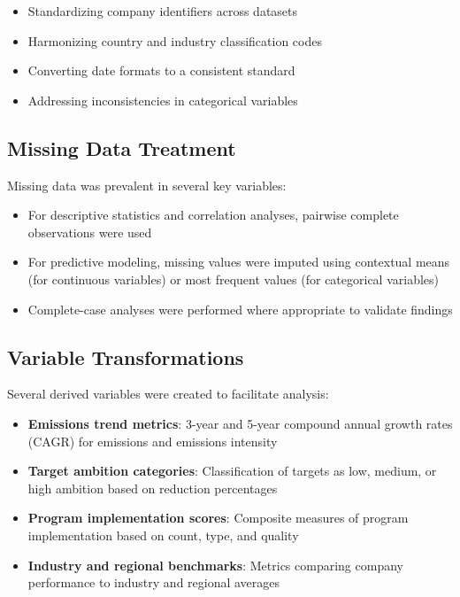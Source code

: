 \documentclass[11pt,a4paper]{article}
\begin{document}
\begin{itemize}
    \item Standardizing company identifiers across datasets
    \item Harmonizing country and industry classification codes
    \item Converting date formats to a consistent standard
    \item Addressing inconsistencies in categorical variables
\end{itemize}

\subsection{Missing Data Treatment}
Missing data was prevalent in several key variables:

\begin{itemize}
    \item For descriptive statistics and correlation analyses, pairwise complete observations were used
    \item For predictive modeling, missing values were imputed using contextual means (for continuous variables) or most frequent values (for categorical variables)
    \item Complete-case analyses were performed where appropriate to validate findings
\end{itemize}

\subsection{Variable Transformations}
Several derived variables were created to facilitate analysis:

\begin{itemize}
    \item \textbf{Emissions trend metrics}: 3-year and 5-year compound annual growth rates (CAGR) for emissions and emissions intensity
    
    \item \textbf{Target ambition categories}: Classification of targets as low, medium, or high ambition based on reduction percentages
    
    \item \textbf{Program implementation scores}: Composite measures of program implementation based on count, type, and quality
    
    \item \textbf{Industry and regional benchmarks}: Metrics comparing company performance to industry and regional averages
\end{itemize}
\end{document}
